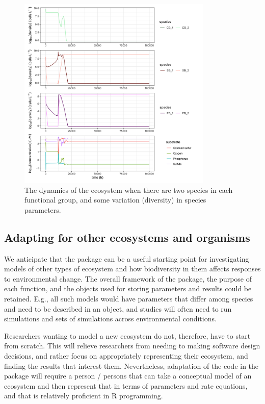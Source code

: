 \documentclass[]{elsarticle} %
\begin{document}
\begin{figure}

{\centering \includegraphics[width=350px]{figures/uc3_supplement_5_4} 

}

\caption{The dynamics of the ecosystem when there are two species in each functional group, and some variation (diversity) in species parameters.}\label{fig:uc3}
\end{figure}

\hypertarget{adapting-for-other-ecosystems-and-organisms}{%
\subsection{Adapting for other ecosystems and
organisms}\label{adapting-for-other-ecosystems-and-organisms}}

We anticipate that the package can be a useful starting point for
investigating models of other types of ecosystem and how biodiversity in
them affects responses to environmental change. The overall framework of
the package, the purpose of each function, and the objects used for
storing parameters and results could be retained. E.g., all such models
would have parameters that differ among species and need to be described
in an object, and studies will often need to run simulations and sets of
simulations across environmental conditions.

Researchers wanting to model a new ecosystem do not, therefore, have to
start from scratch. This will relieve researchers from needing to making
software design decisions, and rather focus on appropriately
representing their ecosystem, and finding the results that interest
them. Nevertheless, adaptation of the code in the package will require a
person / persons that can take a conceptual model of an ecosystem and
then represent that in terms of parameters and rate equations, and that
is relatively proficient in R programming.
\end{document}
